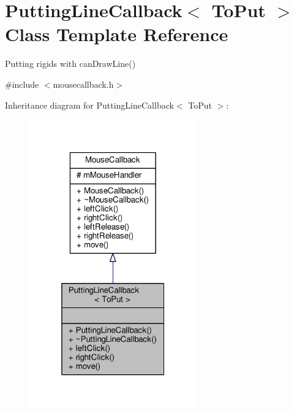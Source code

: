 \hypertarget{classPuttingLineCallback}{}\section{Putting\+Line\+Callback$<$ To\+Put $>$ Class Template Reference}
\label{classPuttingLineCallback}


Putting rigids with can\+Draw\+Line()  




{\ttfamily \#include $<$mousecallback.\+h$>$}



Inheritance diagram for Putting\+Line\+Callback$<$ To\+Put $>$\+:\nopagebreak
\begin{figure}[H]
\begin{center}
\leavevmode
\includegraphics[width=205pt]{classPuttingLineCallback__inherit__graph}
\end{center}
\end{figure}


